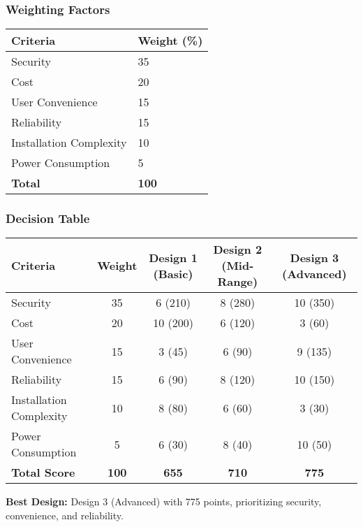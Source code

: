 \subsubsection{Weighting Factors}
\begin{tabular}{ll}
    \toprule
    Criteria & Weight (\%) \\
    \midrule
    Security & 35 \\
    Cost & 20 \\
    User Convenience & 15 \\
    Reliability & 15 \\
    Installation Complexity & 10 \\
    Power Consumption & 5 \\
    \textbf{Total} & \textbf{100} \\
    \bottomrule
\end{tabular}

\subsubsection{Decision Table}
\begin{tabular}{lcccc}
    \toprule
    Criteria & Weight & Design 1 (Basic) & Design 2 (Mid-Range) & Design 3 (Advanced) \\
    \midrule
    Security & 35 & 6 (210) & 8 (280) & 10 (350) \\
    Cost & 20 & 10 (200) & 6 (120) & 3 (60) \\
    User Convenience & 15 & 3 (45) & 6 (90) & 9 (135) \\
    Reliability & 15 & 6 (90) & 8 (120) & 10 (150) \\
    Installation Complexity & 10 & 8 (80) & 6 (60) & 3 (30) \\
    Power Consumption & 5 & 6 (30) & 8 (40) & 10 (50) \\
    \textbf{Total Score} & \textbf{100} & \textbf{655} & \textbf{710} & \textbf{775} \\
    \bottomrule
\end{tabular}

\textbf{Best Design:} Design 3 (Advanced) with 775 points, prioritizing security, convenience, and reliability.